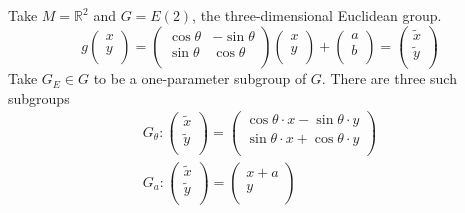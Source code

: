 \begin{example}[]
  Take $M = \mathbb{R}^2$  and $G = E(2)$, the three-dimensional Euclidean group.
  \begin{equation}
    g 
    \begin{pmatrix}
    x \\
    y \\
    \end{pmatrix} =
    \begin{pmatrix}
     \cos \theta & - \sin \theta \\
     \sin \theta & \cos \theta \\
    \end{pmatrix} 
    \begin{pmatrix}
    x \\
    y \\
    \end{pmatrix} + 
    \begin{pmatrix}
    a \\
    b \\
    \end{pmatrix}
    =
    \begin{pmatrix}
    \tilde{x} \\
    \tilde{y} \\
    \end{pmatrix}
  \end{equation}
  Take $G_E \in G$ to be a one-parameter subgroup of  $G$.
  There are three such subgroups
   \begin{gather}
    G_\theta: 
    \begin{pmatrix}
    \tilde{x} \\
    \tilde{y} \\
    \end{pmatrix} = 
    \begin{pmatrix}
    \cos \theta \cdot x - \sin \theta \cdot y \\
    \sin \theta \cdot x + \cos \theta \cdot y \\
    \end{pmatrix} \\
    G_a \colon
    \begin{pmatrix}
    \tilde{x} \\
    \tilde{y} \\
    \end{pmatrix} = 
    \begin{pmatrix}
    x + a \\
    y \\
    \end{pmatrix} \\

\end{gather}
\end{example}
